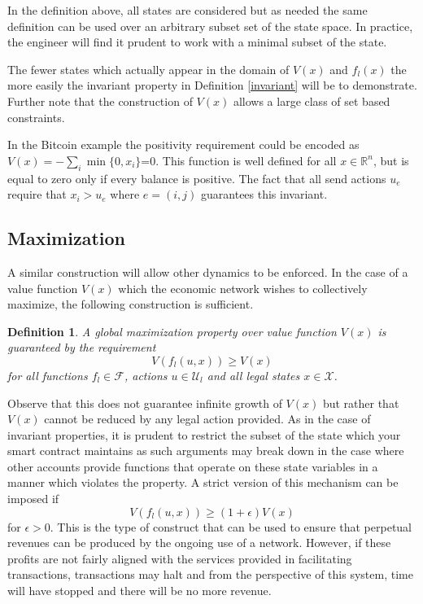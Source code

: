 \documentclass[letterpaper, 10 pt, conference]{ieeeconf}  %
\newtheorem{definition}{Definition}
\begin{document}
In the definition above, all states are considered but as needed the same definition can be used over an arbitrary subset set of the state space. In practice, the engineer will find it prudent to work with a minimal subset of the state. 

The fewer states which actually appear in the domain of $V(x)$ and $f_l(x)$ the more easily the invariant property in Definition \ref{invariant} will be to demonstrate. Further note that the construction of $V(x)$ allows a large class of set based constraints. 

In the Bitcoin example the positivity requirement could be encoded as $V(x) = -\sum_i \min\{0,x_i\}$=0. This function is well defined for all $x\in \mathbb{R}^{n}$, but is equal to zero only if every balance is positive. The fact that all send actions $u_e$ require that $x_i>u_e$ where $e=(i,j)$ guarantees this invariant. 

\subsection{Maximization}
A similar construction will allow other dynamics to be enforced. In the case of a value function $V(x)$ which the economic network wishes to collectively maximize, the following construction is sufficient.

\begin{definition}
A global maximization property over value function $V(x)$ is guaranteed by the requirement
\[
V(f_l(u,x)) \ge V(x)
\]
for all functions $f_l\in \mathcal{F}$, actions $u\in \mathcal{U}_l$ and all legal states $x\in\mathcal{X}$.
\end{definition}

Observe that this does not guarantee infinite growth of $V(x)$ but rather that $V(x)$ cannot be reduced by any legal action provided. As in the case of invariant properties, it is prudent to restrict the subset of the state which your smart contract maintains as such arguments may break down in the case where other accounts provide functions that operate on these state variables in a manner which violates the property. A strict version of this mechanism can be imposed if 
\begin{equation}
V(f_l(u,x)) \ge (1+\epsilon)V(x)
\end{equation} 
for $\epsilon>0$. This is the type of construct that can be used to ensure that perpetual revenues can be produced by the ongoing use of a network. However, if these profits are not fairly aligned with the services provided in facilitating transactions, transactions may halt and from the perspective of this system, time will have stopped and there will be no more revenue.
\end{document}
